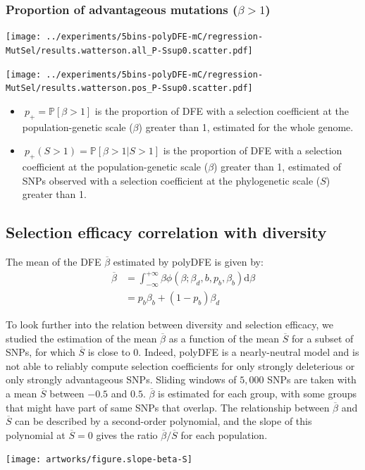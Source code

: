 \documentclass{article}
\newcommand{\der}{\textrm{d}}
\newcommand{\proba}{\mathbb{P}}
\newcommand{\Sphy}{S}
\newcommand{\SphyMean}{\overline{\Sphy}}
\newcommand{\divAdv}{ \Sphy > 1}
\newcommand{\Spop}{\beta}
\newcommand{\SpopMean}{\overline{\Spop}}
\newcommand{\polyAdv}{ \Spop > 1}
\begin{document}
    \subsubsection{Proportion of advantageous mutations ($\polyAdv$)}\label{subsec:proportion-advantageous-mutations}
    \begin{minipage}{0.32\linewidth}
        \texttt{[image: ../experiments/5bins-polyDFE-mC/regression-MutSel/results.watterson.all\_P-Ssup0.scatter.pdf]}
    \end{minipage}
    \begin{minipage}{0.32\linewidth}
        \texttt{[image: ../experiments/5bins-polyDFE-mC/regression-MutSel/results.watterson.pos\_P-Ssup0.scatter.pdf]}
    \end{minipage}
    \begin{itemize}
        \item $\ p_+ = \proba [ \polyAdv  ]$ is the proportion of DFE with a selection coefficient at the population-genetic scale ($\Spop$) greater than 1, estimated for the whole genome.
        \item $\ p_+( \divAdv) = \proba [ \polyAdv | \divAdv] $ is the proportion of DFE with a selection coefficient at the population-genetic scale ($\Spop$) greater than 1, estimated of SNPs observed with a selection coefficient at the phylogenetic scale ($\Sphy$) greater than 1.
    \end{itemize}

    \subsection{Selection efficacy correlation with diversity}\label{subsec:selection-efficacy-correlation-with-diversity}
    The mean of the DFE $\SpopMean$ estimated by polyDFE is given by:
    \begin{align*}
        \SpopMean & = \int_{-\infty}^{+\infty} \Spop \phi \left( \Spop; \Spop_d , b, p_b, \Spop_b \right) \der \Spop \\
        & =  p_b \Spop_b + \left( 1 - p_b \right) \Spop_d
    \end{align*}

    To look further into the relation between diversity and selection efficacy, we studied the estimation of the mean $\SpopMean$ as a function of the mean $\SphyMean$ for a subset of SNPs, for which $\SphyMean$ is close to $0$.
    Indeed, polyDFE is a nearly-neutral model and is not able to reliably compute selection coefficients for only strongly deleterious or only strongly advantageous SNPs.
    Sliding windows of $5,000$ SNPs are taken with a mean $\SphyMean$ between $-0.5$ and $0.5$.
    $\SpopMean$ is estimated for each group, with some groups that might have part of same SNPs that overlap.
    The relationship between $\SpopMean$ and $\SphyMean$ can be described by a second-order polynomial, and the slope of this polynomial at $\SphyMean=0$ gives the ratio $\SpopMean/\SphyMean$ for each population.
    \begin{center}
        \texttt{[image: artworks/figure.slope-beta-S]}
    \end{center}
\end{document}
